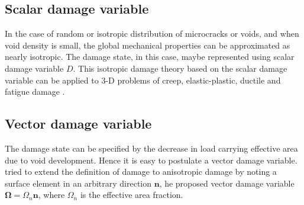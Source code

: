 \documentclass[12pt,a4paper,twoside,openright]{report}
\begin{document}
\subsection{Scalar damage variable}
\indent\indent\indent In the case of random or isotropic distribution of microcracks or voids, and when void density is small, the global mechanical properties can be approximated as nearly isotropic. The damage state, in this case, maybe represented using scalar damage variable $D$. This isotropic damage theory based on the scalar damage variable can be applied to 3-D problems of creep, elastic-plastic, ductile and fatigue damage \citep{lemaitre2012course}.
\subsection{Vector damage variable}
\indent\indent\indent The damage state can be specified by the decrease in load carrying effective area due to void development. Hence it is easy to postulate a vector damage variable.  \citep{kachanov1986introduction} tried to extend the definition of damage to anisotropic damage by noting a surface element in an arbitrary direction $\mathbf{n}$, he proposed vector damage variable $ \mathbf{\Omega} = \Omega_{n} \mathbf{n} $, where $\Omega_{n}$ is the effective area fraction. 
\end{document}
